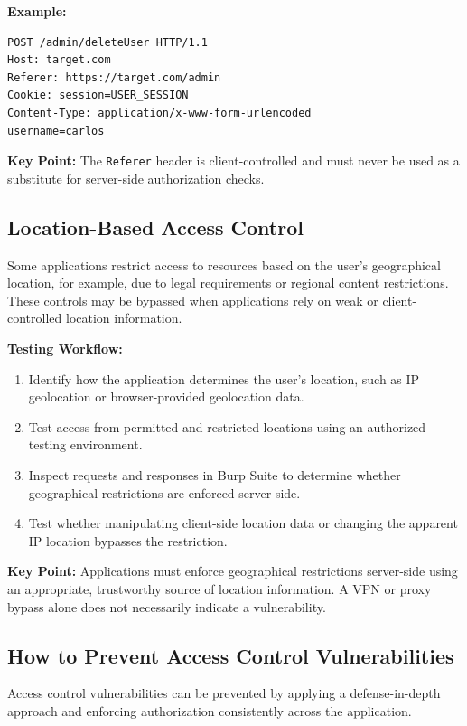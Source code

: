 \documentclass[11pt,a4paper]{article}
\begin{document}
\textbf{Example:}
\begin{lstlisting}
POST /admin/deleteUser HTTP/1.1
Host: target.com
Referer: https://target.com/admin
Cookie: session=USER_SESSION
Content-Type: application/x-www-form-urlencoded
username=carlos
\end{lstlisting}

\textbf{Key Point:} The \texttt{Referer} header is client-controlled and must never be used as a substitute for server-side authorization checks.

\subsection{Location-Based Access Control}

Some applications restrict access to resources based on the user's geographical location, for example, due to legal requirements or regional content restrictions.
These controls may be bypassed when applications rely on weak or client-controlled location information.

\textbf{Testing Workflow:}
\begin{enumerate}
    \item Identify how the application determines the user's location, such as IP geolocation or browser-provided geolocation data.
    \item Test access from permitted and restricted locations using an authorized testing environment.
    \item Inspect requests and responses in Burp Suite to determine whether geographical restrictions are enforced server-side.
    \item Test whether manipulating client-side location data or changing the apparent IP location bypasses the restriction.
\end{enumerate}

\textbf{Key Point:} Applications must enforce geographical restrictions server-side using an appropriate, trustworthy source of location information. A VPN or proxy bypass alone does not necessarily indicate a vulnerability.

\subsection{How to Prevent Access Control Vulnerabilities}

Access control vulnerabilities can be prevented by applying a defense-in-depth approach and enforcing authorization consistently across the application.
\end{document}
